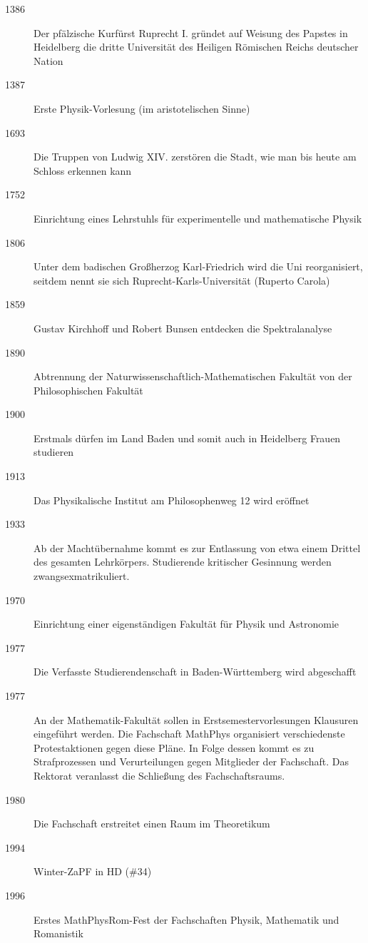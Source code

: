 \begin{description}
\item[1386] Der pfälzische Kurfürst Ruprecht I. gründet auf Weisung des Papstes in Heidelberg die dritte Universität des Heiligen Römischen Reichs deutscher Nation
\item[1387]  Erste Physik-Vorlesung (im aristotelischen Sinne)
\item[1693]Die Truppen von Ludwig XIV. zerstören die Stadt, wie man bis heute am Schloss erkennen kann
\item[1752] Einrichtung eines Lehrstuhls für experimentelle und mathematische Physik
\item[1806] Unter dem badischen Großherzog Karl-Friedrich wird die Uni reorganisiert, seitdem nennt sie sich Ruprecht-Karls-Universität (Ruperto Carola)


\item[1859] Gustav Kirchhoff und Robert Bunsen entdecken die Spektralanalyse
\item[1890] Abtrennung der Naturwissenschaftlich-Mathematischen Fakultät von der Philosophischen Fakultät
\item[1900] Erstmals dürfen im Land Baden und somit auch in Heidelberg Frauen studieren
\item[1913] Das Physikalische Institut am Philosophenweg 12 wird eröffnet
\item[1933] Ab der Machtübernahme kommt es zur Entlassung von etwa einem Drittel des gesamten Lehrkörpers. Studierende kritischer Gesinnung werden zwangsexmatrikuliert. 


\item[1970] Einrichtung einer eigenständigen Fakultät für Physik und Astronomie
\item[1977] Die Verfasste Studierendenschaft in Baden-Württemberg wird abgeschafft
\item[1977] An der Mathematik-Fakultät sollen in Erstsemestervorlesungen Klausuren eingeführt werden.
Die Fachschaft MathPhys organisiert verschiedenste Protestaktionen gegen diese Pläne. In Folge dessen kommt es zu Strafprozessen und Verurteilungen gegen Mitglieder der Fachschaft. Das Rektorat veranlasst die Schließung des Fachschaftsraums.
\item[1980] Die Fachschaft erstreitet einen Raum im Theoretikum
\item[1994] Winter-ZaPF in HD (\#34)
\item[1996] Erstes MathPhysRom-Fest der Fachschaften Physik, Mathematik und Romanistik


\end{description}
